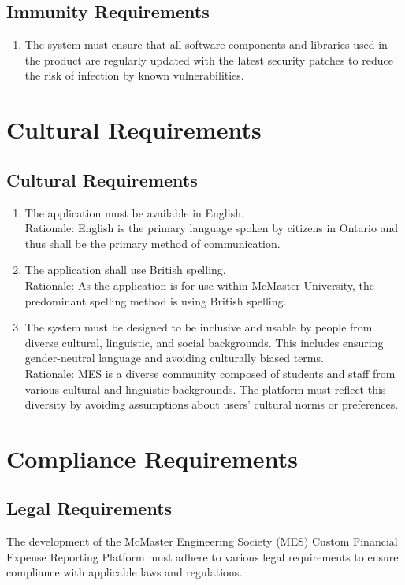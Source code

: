 \documentclass[12pt]{article}
\begin{document}
\subsection{Immunity Requirements}

\begin{enumerate}
  \item The system must ensure that all software components and libraries used in the product are regularly updated with the latest security patches to reduce the risk of infection by known vulnerabilities.
\end{enumerate}

\section{Cultural Requirements}
\subsection{Cultural Requirements}
\begin{enumerate}
  \item The application must be available in English. \\
  Rationale: English is the primary language spoken by citizens in Ontario and thus shall be the primary method of communication.
  \item The application shall use British spelling. \\
  Rationale: As the application is for use within McMaster University, the predominant spelling method is using British spelling.
  \item The system must be designed to be inclusive and usable by people from diverse cultural, linguistic, and social backgrounds. This includes ensuring gender-neutral language and avoiding culturally biased terms. \\
  Rationale:  MES is a diverse community composed of students and staff from various cultural and linguistic backgrounds. The platform must reflect this diversity by avoiding assumptions about users' cultural norms or preferences.
\end{enumerate}

\section{Compliance Requirements}

\subsection{Legal Requirements}
The development of the McMaster Engineering Society (MES) Custom Financial Expense Reporting Platform must adhere to various legal requirements to ensure compliance with applicable laws and regulations.
\end{document}
